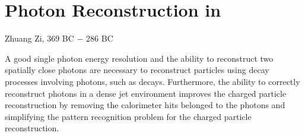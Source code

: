 \chapter{Photon Reconstruction in \pandora}
\label{chap:Photon}

%
{Zhuang Zi, 369 BC $-$ 286 BC}

A good single photon energy resolution and the ability to reconstruct two spatially close photons are necessary to reconstruct particles using decay processes involving photons, such as \HepProcess{\Ppizero\to\Pgamma\Pgamma} decays. Furthermore, the ability to correctly reconstruct photons in a dense jet environment improves the charged particle reconstruction by removing the calorimeter hits belonged to the photons and simplifying the  pattern recognition problem for the charged particle reconstruction.







